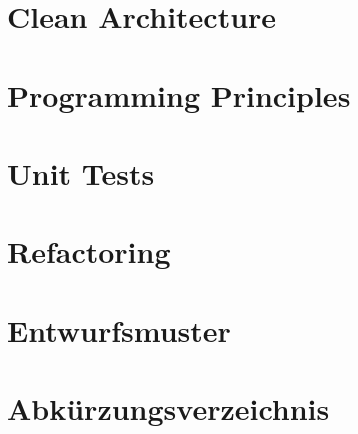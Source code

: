 \documentclass[
  ngerman
  ,12pt
  ,pdftex
]{report}
\begin{document}
\begin{onehalfspace}


    \newpage
    \tableofcontents

    \newpage
    \setcounter{savepage}{\value{page}}


    
    

    \chapter{Clean Architecture}
    

    \chapter{Programming Principles}
    

    \chapter{Unit Tests}
    

    \chapter{Refactoring}
    

    \chapter{Entwurfsmuster}
    


    \newpage
    \setcounter{page}{\value{savepage}}


    \chapter*{Abkürzungsverzeichnis}
    
    \newpage


    \listoffigures
    \newpage

    \lstlistoflistings


    \newpage
    \def\refname{Literaturverzeichnis}        %
    \nocite{*}
    \printbibliography


\end{onehalfspace}
\end{document}
